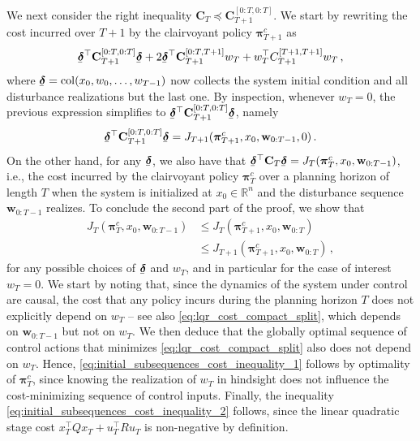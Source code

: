 \documentclass[conference]{IEEEtran}
\newcommand{\ubar}[1]{\underaccent{\bar}{#1}}
\begin{document}
    We next consider the right inequality $\mathbf{C}_{T} \preceq \mathbf{C}_{T+1}^{[0:T, 0:T]}$. We start by rewriting the cost incurred over $T+1$ by the clairvoyant policy $\bm{\pi}_{T+1}^c$ as
    \begin{equation*}
        \ubar{\bm{\delta}}^\top \mathbf{C}_{T+1}^{[0:T, 0:T]} \ubar{\bm{\delta}}
        + 2 \ubar{\bm{\delta}}^\top \mathbf{C}_{T+1}^{[0:T, T+1]} w_{T} + w_{T}^\top C_{T+1}^{[T+1, T+1]} w_{T}\,,
    \end{equation*}
    where $\ubar{\bm{\delta}} = \operatorname{col}(x_0, w_0, \dots, w_{T-1})$ now collects the system initial condition and all disturbance realizations but the last one. By inspection, whenever $w_T = 0$, the previous expression simplifies to $\ubar{\bm{\delta}}^\top \mathbf{C}_{T+1}^{[0:T, 0:T]} \ubar{\bm{\delta}}$, namely
    \begin{equation*}
        \ubar{\bm{\delta}}^\top \mathbf{C}_{T+1}^{[0:T, 0:T]} \ubar{\bm{\delta}} = J_{T+1}(\bm{\pi}_{T+1}^c, x_0, \mathbf{w}_{0:T-1}, 0)\,.
    \end{equation*}
    On the other hand, for any $\ubar{\bm{\delta}}$, we also have that $\ubar{\bm{\delta}}^\top \mathbf{C}_T \ubar{\bm{\delta}} = J_{T}(\bm{\pi}_{T}^c, x_{0}, \mathbf{w}_{0:T-1})$, i.e., the cost incurred by the clairvoyant policy $\bm{\pi}_{T}^c$ over a planning horizon of length $T$ when the system is initialized at $x_{0} \in \mathbb{R}^n$ and the disturbance sequence $\mathbf{w}_{0:T-1}$ realizes. To conclude the second part of the proof, we show that
    \begin{subequations}
        \label{eq:initial_subsequences_cost_inequality}
        \begin{align}
            J_{T}(\bm{\pi}_{T}^c, x_{0}, \mathbf{w}_{0:T-1}) &\leq J_{T}(\bm{\pi}_{T+1}^c, x_0, \mathbf{w}_{0:T})\label{eq:initial_subsequences_cost_inequality_1}\\
            &\leq J_{T+1}(\bm{\pi}_{T+1}^c, x_0, \mathbf{w}_{0:T})\label{eq:initial_subsequences_cost_inequality_2}\,,
        \end{align}
    \end{subequations}
    for any possible choices of $\ubar{\bm{\delta}}$ and $w_T$, and in particular for the case of interest $w_T = 0$. We start by noting that, since the dynamics of the system under control are causal, the cost that any policy incurs during the planning horizon $T$ does not explicitly depend on $w_T$ – see also \eqref{eq:lqr_cost_compact_split}, which depends on $\mathbf{w}_{0:T-1}$ but not on $w_T$. We then deduce that the globally optimal sequence of control actions that minimizes \eqref{eq:lqr_cost_compact_split} also does not depend on $w_T$. Hence, \eqref{eq:initial_subsequences_cost_inequality_1} follows by optimality of $\bm{\pi}^c_T$, since knowing the realization of $w_T$ in hindsight does not influence the cost-minimizing sequence of control inputs. Finally, the inequality \eqref{eq:initial_subsequences_cost_inequality_2} follows, since the linear quadratic stage cost $x_T^\top Q x_T + u_T^\top R u_T$ is non-negative by definition.
\end{document}

